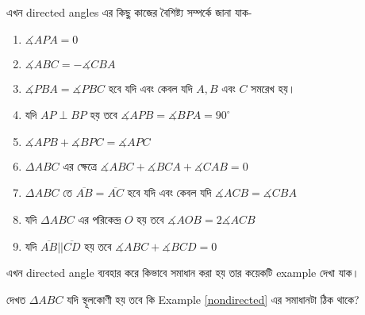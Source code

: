 \documentclass[a4paper,11pt]{article}
\newcommand{\drg}{^{\circ}}
\begin{document}
এখন directed angles এর কিছু কাজের বৈশিষ্ট্য সম্পর্কে জানা যাক- 
\begin{enumerate}[nosep]
	\item $\measuredangle APA=0$
	\item $\measuredangle ABC=-\measuredangle CBA$
	\item $\measuredangle PBA=\measuredangle PBC$ হবে যদি এবং কেবল যদি $A,B$ এবং $C$ সমরেখ হয়।
	\item যদি $AP \perp BP$ হয় তবে $\measuredangle APB=\measuredangle BPA=90\drg$
	\item $\measuredangle APB+\measuredangle BPC=\measuredangle APC$
	\item $\Delta ABC$ এর ক্ষেত্রে $\measuredangle ABC+\measuredangle BCA+\measuredangle CAB=0$
	\item $\Delta ABC$ তে $\overline{AB}=\overline{AC}$ হবে যদি এবং কেবল যদি $\measuredangle ACB=\measuredangle CBA$
	\item যদি $\Delta ABC$ এর পরিকেন্দ্র $O$ হয় তবে $\measuredangle AOB=2\measuredangle ACB$
	\item যদি $\overline{AB}||\overline{CD}$ হয় তবে $\measuredangle ABC+\measuredangle BCD=0$
\end{enumerate}
এখন directed angle ব্যবহার করে কিভাবে সমাধান করা হয় তার কয়েকটি  example দেখা যাক।  
\begin{xmpl}
	দেখত $\Delta ABC$ যদি স্থূলকোণী হয় তবে কি Example \ref{nondirected} এর সমাধানটা ঠিক থাকে? 
\end{xmpl}
\end{document}
